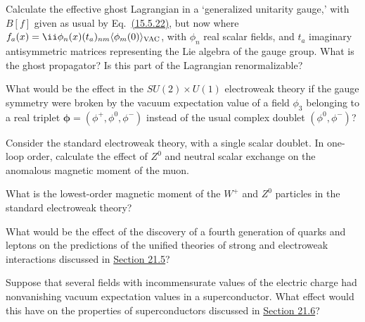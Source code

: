 
\begin{enumerate}
 Calculate the effective ghost Lagrangian in a `generalized unitarity
gauge,' with $B[f]$ given as usual by
Eq.~\hyperref[eq:15.5.22]{(15.5.22)}, but now where
$f_a(x)=\ii\phi_n(x)(t_a)_{nm}
\langle\phi_m(0)\rangle_{\rm VAC}$, with $\phi_n$ real scalar fields, and
$t_a$ imaginary antisymmetric matrices representing the Lie algebra of
the gauge group. What is the ghost propagator? Is this part of the
Lagrangian renormalizable?

 What would be the effect in the $SU(2)\times U(1)$ electroweak theory if
the gauge symmetry were broken by the vacuum expectation value of a field
$\phi_3$ belonging to a real triplet
$\boldsymbol{\phi}=(\phi^+,\phi^0,\phi^-)$ instead of the usual complex doublet
$(\phi^0,\phi^-)$?

 Consider the standard electroweak theory, with a single scalar doublet.
In one-loop order, calculate the effect of $Z^0$ and neutral scalar exchange
on the anomalous magnetic moment of the muon.

 What is the lowest-order magnetic moment of the $W^+$ and $Z^0$
particles in the standard electroweak theory?

 What would be the effect of the discovery of a fourth generation of
quarks and leptons on the predictions of the unified theories of strong and
electroweak interactions discussed in
\hyperref[sec:21.5]{Section 21.5}?

 Suppose that several fields with incommensurate values of the electric
charge had nonvanishing vacuum expectation values in a superconductor. What
effect would this have on the properties of superconductors discussed in
\hyperref[sec:21.6]{Section 21.6}?
\end{enumerate}

